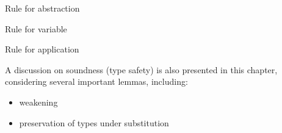 \documentclass{beamer}
\begin{document}
\begin{frame}

\begin{small}
\begin{block}{Rule for abstraction} 
\begin{prooftree}
\end{prooftree}
\end{block} \pause

\begin{block}{Rule for variable} 
\begin{prooftree}
\end{prooftree}
\end{block} \pause


\begin{block}{Rule for application} 
\begin{prooftree}
\end{prooftree}
\end{block}

\end{small}

\end{frame}

\begin{frame}

A discussion on soundness (type safety) is also presented in 
this chapter, considering several important lemmas, including: 

\begin{itemize}
\item weakening 
\item preservation of types under substitution
\end{itemize} 

\end{frame}
\end{document}
